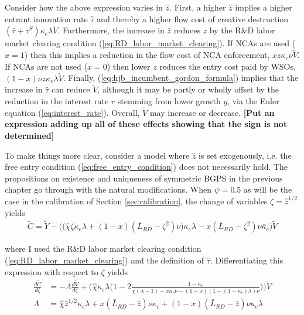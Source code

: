 Consider how the above expression varies in $\hat{z}$. First, a higher $\hat{z}$ implies a higher entrant innovation rate $\hat{\tau}$ and thereby a higher flow cost of creative destruction $(\hat{\tau} + \tau^S)\kappa_e \lambda \tilde{V}$. Furthermore, the increase in $\hat{z}$ reduces $z$ by the R\&D labor market clearing condition (\ref{eq:RD_labor_market_clearing}). If NCAs are used ($x = 1$) then this implies a reduction in the flow cost of NCA enforcement, $x z \kappa_c \nu \tilde{V}$. If NCAs are not used ($x = 0$) then lower $z$ reduces the entry cost paid by WSOs, $(1-x) \nu  z \kappa_e \lambda \tilde{V}$. Finally, (\ref{eq:hjb_incumbent_gordon_formula}) implies that the increase in $\hat{\tau}$ can reduce $\tilde{V}$, although it may be partly or wholly offset by the reduction in the interest rate $r$ stemming from lower growth $g$, via the Euler equation (\ref{eq:interest_rate}). Overall, $\tilde{V}$ may increase or decrease. \textbf{[Put an expression adding up all of these effects showing that the sign is not determined]} 

To make things more clear, consider a model where $\hat{z}$ is set exogenously, i.e. the free entry condition (\ref{eq:free_entry_condition}) does not necessarily hold. The propositions on existence and uniqueness of symmetric BGPS in the previous chapter go through with the natural modifications. When $\psi = 0.5$ as will be the case in the calibration of Section \ref{sec:calibration}, the change of variables $\zeta = \hat{z}^{1/2}$ yields
\begin{align}
\tilde{C} = \tilde{Y} - \Big(\big(\hat{\chi} \zeta \kappa_e \lambda + (1-x) (\bar{L}_{RD} - \zeta^2) \nu\big) \kappa_e \lambda   - x (\bar{L}_{RD} - \zeta^2) \nu \bar{\kappa}_c \Big)\tilde{V} 
\end{align}

where I used the R\&D labor market clearing condition (\ref{eq:RD_labor_market_clearing}) and the definition of $\hat{\tau}$. Differentiating this expression with respect to $\zeta$ yields
\begin{align}
\frac{d\tilde{C}}{d\zeta} &= - \Lambda \frac{d\tilde{V}}{d\zeta}  + \Big(  \hat{\chi} \kappa_e \lambda \big( 1 - 2\frac{1-\kappa_e}{\chi(\lambda -1) - x \kappa_c \nu - (1-x) (1 - (1-\kappa_e) \lambda) \nu }\big) \Big) \tilde{V} \\
\Lambda &= \hat{\chi} \hat{z}^{1/2} \kappa_e \lambda  + x (\bar{L}_{RD} - \hat{z}) \nu \kappa_c + (1-x)  (\bar{L}_{RD} - \hat{z}) \nu \kappa_e \lambda 
\end{align}

